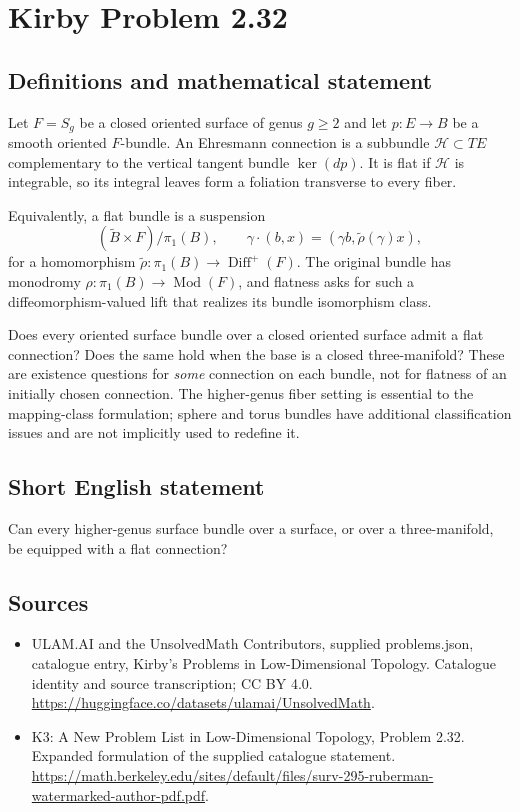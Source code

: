 \documentclass[11pt,a4paper]{article}
\begin{document}
\section*{Kirby Problem 2.32}\label{statement}

\subsection{Definitions and mathematical statement}
Let $F=S_g$ be a closed oriented surface of genus $g\geq2$ and let
$p:E\to B$ be a smooth oriented $F$-bundle. An Ehresmann connection is a
subbundle $\mathcal H\subset TE$ complementary to the vertical tangent bundle
$\ker(dp)$. It is flat if $\mathcal H$ is integrable, so its integral leaves
form a foliation transverse to every fiber.

Equivalently, a flat bundle is a suspension
\[
 (\widetilde B\times F)/\pi_1(B),\qquad
 \gamma\cdot(b,x)=(\gamma b,\widetilde\rho(\gamma)x),
\]
for a homomorphism $\widetilde\rho:\pi_1(B)\to\operatorname{Diff}^+(F)$.
The original bundle has monodromy
$\rho:\pi_1(B)\to\operatorname{Mod}(F)$, and flatness asks for such a
diffeomorphism-valued lift that realizes its bundle isomorphism class.

Does every oriented surface bundle over a closed oriented surface admit a
flat connection? Does the same hold when the base is a closed three-manifold?
These are existence questions for \emph{some} connection on each bundle, not
for flatness of an initially chosen connection. The higher-genus fiber setting
is essential to the mapping-class formulation; sphere and torus bundles have
additional classification issues and are not implicitly used to redefine it.
\subsection{Short English statement}
Can every higher-genus surface bundle over a surface, or over a three-manifold, be equipped with a flat connection?
\subsection{Sources}
\begin{itemize}
\item[S1] ULAM.AI and the UnsolvedMath Contributors, supplied problems.json, catalogue entry, Kirby's Problems in Low-Dimensional Topology. Catalogue identity and source transcription; CC BY 4.0.
\url{https://huggingface.co/datasets/ulamai/UnsolvedMath}.
\item[S2] K3: A New Problem List in Low-Dimensional Topology, Problem 2.32. Expanded formulation of the supplied catalogue statement.
\url{https://math.berkeley.edu/sites/default/files/surv-295-ruberman-watermarked-author-pdf.pdf}.
\end{itemize}
\end{document}
